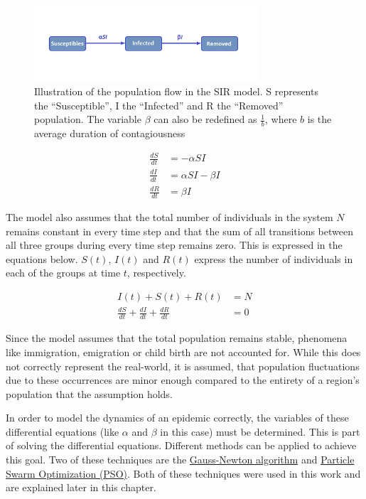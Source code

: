 \begin{figure}
	\begin{center}
		\includegraphics[width=0.75\textwidth]{./figures/SIR.png}
		\caption{Illustration of the population flow in the SIR model. S represents the ``Susceptible'', I
			the ``Infected'' and R the ``Removed'' population. The variable $\beta$ can also be redefined
			as $\frac{1}{b}$, where $b$ is the average duration of contagiousness}
		\label{fig:SIR}
	\end{center}
\end{figure}


\begin{align}
	\label{eq:SIR1}
	\frac{dS}{dt} &= -\alpha S I \\
	\frac{dI}{dt} &= \alpha S I - \beta I \\
	\frac{dR}{dt} &= \beta I
\end{align}


The model also assumes that the total number of individuals in the system $N$ remains constant in every time step and
that the sum of all transitions between all three groups during every time step remains zero\cite{kermack1991contributions}. This is expressed in the equations below.
$S(t)$, $I(t)$ and $R(t)$ express the number of individuals in each of the groups at time $t$, respectively.

\begin{align}
	\label{eq:SIR2}
	I(t) + S(t) + R(t) &= N \\
	\frac{dS}{dt} + \frac{dI}{dt} + \frac{dR}{dt} &= 0
\end{align}


Since the model assumes that the total population remains stable, phenomena like immigration, emigration or child birth are not accounted
for. While this does not correctly represent the real-world, it is assumed, that population fluctuations
due to these occurrences are minor enough compared to the entirety of a region's population that the assumption holds.\newline


In order to model the dynamics of an epidemic correctly, the variables of these differential
equations (like $\alpha$ and $\beta$ in this case) must be determined. This is part of solving the differential equations.
Different methods can be applied to achieve this goal. Two of these techniques are the \hyperref[sec:Gauss]{Gauss-Newton algorithm}
and \hyperref[sec:PSO]{Particle Swarm Optimization (PSO)}. Both of these techniques were used in this work and are explained
later in this chapter.


